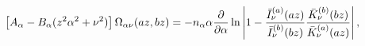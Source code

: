 \begin{equation}
\left[ A_{\alpha }-B_{\alpha }(z^{2}\alpha ^{2}+\nu ^{2})\right] \Omega
_{\alpha \nu }(az,bz)=-n_{\alpha }\alpha \frac{\partial }{\partial \alpha }%
\ln \left| 1-\frac{\bar{I}_{\nu }^{(a)}(az)}{\bar{I}_{\nu }^{(b)}(bz)}\frac{%
\bar{K}_{\nu }^{(b)}(bz)}{\bar{K}_{\nu }^{(a)}(az)}\right| ,
\label{Omeganew}
\end{equation}

